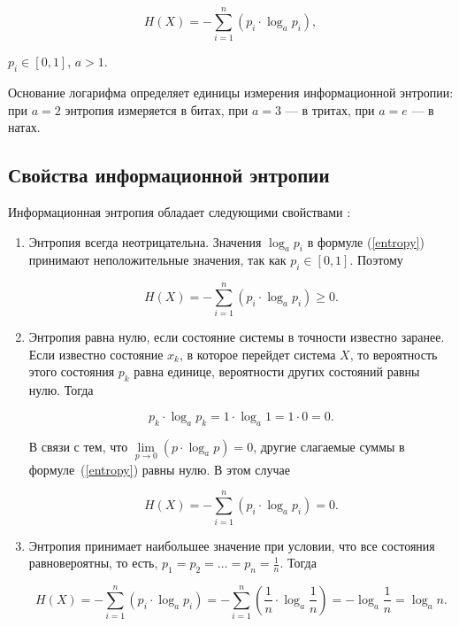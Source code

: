 \begin{equation}\label{entropy}
	H(X) = -\sum_{i = 1}^n (p_{i} \cdot \log_{a}p_{i}),
\end{equation}

 $p_{i} \in [0, 1]$, $a > 1$.

Основание логарифма определяет единицы измерения информационной энтропии: при $a = 2$ энтропия измеряется в битах, при $a = 3$ --- в тритах, при $a = e$ --- в натах.

\subsection{Свойства информационной энтропии}\label{properties}

Информационная энтропия обладает следующими свойствами \cite{properties}:

\begin{enumerate}
	\item Энтропия всегда неотрицательна. Значения $\log_{a} p_{i}$ в формуле (\ref{entropy}) принимают неположительные значения, так как $p_{i} \in [0, 1]$. Поэтому
	
\begin{equation}
	H(X) = -\sum_{i = 1}^n (p_{i} \cdot \log_{a} p_{i}) \geqslant 0.
\end{equation}

	\item\label{property2} Энтропия равна нулю, если состояние системы в точности известно заранее. Если известно состояние $x_{k}$, в которое перейдет система $X$, то вероятность этого состояния $p_{k}$ равна единице, вероятности других состояний равны нулю. Тогда
	
\begin{equation}
	p_{k} \cdot \log_{a} p_{k} = 1 \cdot \log_{a} 1 = 1 \cdot 0 = 0.
\end{equation}

В связи с тем, что $\lim\limits_{p \to 0} (p \cdot \log_{a}p) = 0$, другие слагаемые суммы в формуле~(\ref{entropy}) равны нулю. В этом случае 

\begin{equation}
	H(X) = -\sum_{i = 1}^n (p_{i} \cdot \log_{a} p_{i}) = 0.
\end{equation}

	\item\label{property3} Энтропия принимает наибольшее значение при условии, что все состояния равновероятны, то есть, $p_{1} = p_{2} = \dots = p_{n} = \frac{1}{n}$. Тогда
	
\begin{equation}
	H(X) = -\sum_{i = 1}^n (p_{i} \cdot \log_{a} p_{i}) = -\sum_{i = 1}^n (\frac{1}{n} \cdot \log_{a} \frac{1}{n}) = -\log_{a} \frac{1}{n} = \log_{a} n.
\end{equation}
	
\end{enumerate}

